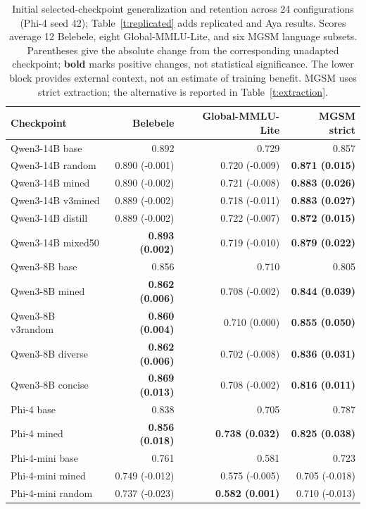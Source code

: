 \begin{table}[t]
\caption{Initial selected-checkpoint generalization and retention across 24 configurations (Phi-4 seed 42); Table~\ref{t:replicated} adds replicated and Aya results. Scores average 12 Belebele, eight Global-MMLU-Lite, and six MGSM language subsets. Parentheses give the absolute change from the corresponding unadapted checkpoint; \textbf{bold} marks positive changes, not statistical significance. The lower block provides external context, not an estimate of training benefit. MGSM uses strict extraction; the alternative is reported in Table~\ref{t:extraction}.}\label{t:standard}
\centering\footnotesize\setlength{\tabcolsep}{4pt}\begin{tabular}{lrrr}\toprule
Checkpoint & Belebele & Global-MMLU-Lite & MGSM strict\\\midrule
Qwen3-14B base & 0.892 & 0.729 & 0.857\\
Qwen3-14B random & 0.890 (-0.001) & 0.720 (-0.009) & \textbf{0.871 (0.015)}\\
Qwen3-14B mined & 0.890 (-0.002) & 0.721 (-0.008) & \textbf{0.883 (0.026)}\\
Qwen3-14B v3mined & 0.889 (-0.002) & 0.718 (-0.011) & \textbf{0.883 (0.027)}\\
Qwen3-14B distill & 0.889 (-0.002) & 0.722 (-0.007) & \textbf{0.872 (0.015)}\\
Qwen3-14B mixed50 & \textbf{0.893 (0.002)} & 0.719 (-0.010) & \textbf{0.879 (0.022)}\\
Qwen3-8B base & 0.856 & 0.710 & 0.805\\
Qwen3-8B mined & \textbf{0.862 (0.006)} & 0.708 (-0.002) & \textbf{0.844 (0.039)}\\
Qwen3-8B v3random & \textbf{0.860 (0.004)} & 0.710 (0.000) & \textbf{0.855 (0.050)}\\
Qwen3-8B diverse & \textbf{0.862 (0.006)} & 0.702 (-0.008) & \textbf{0.836 (0.031)}\\
Qwen3-8B concise & \textbf{0.869 (0.013)} & 0.708 (-0.002) & \textbf{0.816 (0.011)}\\
Phi-4 base & 0.838 & 0.705 & 0.787\\
Phi-4 mined & \textbf{0.856 (0.018)} & \textbf{0.738 (0.032)} & \textbf{0.825 (0.038)}\\
Phi-4-mini base & 0.761 & 0.581 & 0.723\\
Phi-4-mini mined & 0.749 (-0.012) & 0.575 (-0.005) & 0.705 (-0.018)\\
Phi-4-mini random & 0.737 (-0.023) & \textbf{0.582 (0.001)} & 0.710 (-0.013)\\

\end{tabular}
\end{table}
